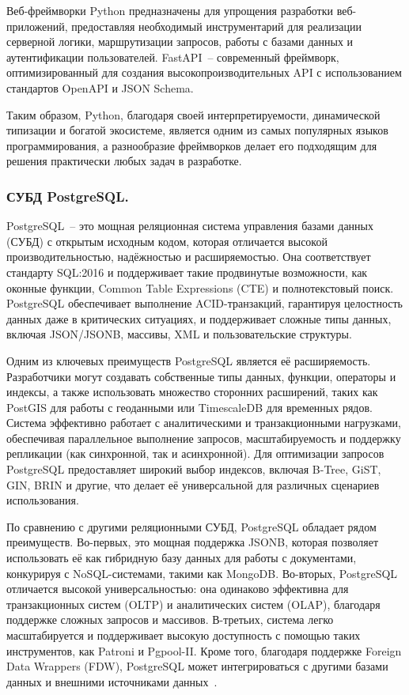 Веб-фреймворки Python предназначены для упрощения разработки веб-приложений, предоставляя необходимый инструментарий для реализации серверной логики, маршрутизации запросов, работы с базами данных и аутентификации пользователей. FastAPI~-- современный фреймворк, оптимизированный для создания высокопроизводительных API с использованием стандартов OpenAPI и JSON Schema.

Таким образом, Python, благодаря своей интерпретируемости, динамической типизации и богатой экосистеме, является одним из самых популярных языков программирования, а разнообразие фреймворков делает его подходящим для решения практически любых задач в разработке.

\subsubsection{СУБД PostgreSQL. }

PostgreSQL~-- это мощная реляционная система управления базами данных (СУБД) с открытым исходным кодом, которая отличается высокой производительностью, надёжностью и расширяемостью. Она соответствует стандарту SQL:2016 и поддерживает такие продвинутые возможности, как оконные функции, Common Table Expressions (CTE) и полнотекстовый поиск. PostgreSQL обеспечивает выполнение ACID-транзакций, гарантируя целостность данных даже в критических ситуациях, и поддерживает сложные типы данных, включая JSON/JSONB, массивы, XML и пользовательские структуры.

Одним из ключевых преимуществ PostgreSQL является её расширяемость. Разработчики могут создавать собственные типы данных, функции, операторы и индексы, а также использовать множество сторонних расширений, таких как PostGIS для работы с геоданными или TimescaleDB для временных рядов. Система эффективно работает с аналитическими и транзакционными нагрузками, обеспечивая параллельное выполнение запросов, масштабируемость и поддержку репликации (как синхронной, так и асинхронной). Для оптимизации запросов PostgreSQL предоставляет широкий выбор индексов, включая B-Tree, GiST, GIN, BRIN и другие, что делает её универсальной для различных сценариев использования.

По сравнению с другими реляционными СУБД, PostgreSQL обладает рядом преимуществ. Во-первых, это мощная поддержка JSONB, которая позволяет использовать её как гибридную базу данных для работы с документами, конкурируя с NoSQL-системами, такими как MongoDB. Во-вторых, PostgreSQL отличается высокой универсальностью: она одинаково эффективна для транзакционных систем (OLTP) и аналитических систем (OLAP), благодаря поддержке сложных запросов и массивов. В-третьих, система легко масштабируется и поддерживает высокую доступность с помощью таких инструментов, как Patroni и Pgpool-II. Кроме того, благодаря поддержке Foreign Data Wrappers (FDW), PostgreSQL может интегрироваться с другими базами данных и внешними источниками данных~\cite{book_postgres_optimization}.

